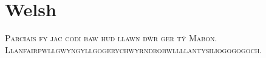 

\presection\section*{\checkno Welsh}\postsection

\textsc{Parciais fy jac codi baw hud llawn dŵr ger tŷ Mabon.}
\textsc{Llan\-fair\-pwll\-gwyngyll\-goger\-ychwyrn\-drobwll\-llan\-tysiliog\-ogogoch.}
